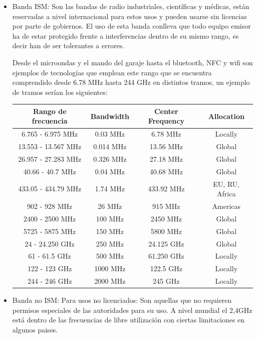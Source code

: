 \documentclass[a4paper ,12pt, onecolumn]{article}
\begin{document}
            \begin{itemize}
                \item Banda ISM: Son las bandas de radio industriales, científicas y médicas, están reservadas a 
                nivel internacional para estos usos y pueden usarse sin licencias por parte de gobiernos. El uso de esta
                banda conlleva que todo equipo emisor ha de estar protegido frente a interferencias dentro de su mismo 
                rango, es decir han de ser tolerantes a errores.
    
                Desde el microondas y el mando del garaje hasta el bluetooth, NFC y wifi son ejemplos de tecnologías
                que emplean este rango que se encuentra comprendido desde   6.78 MHz hasta 244 GHz en distintos tramos,
                un ejemplo de tramos serían los siguientes:
                \begin{center}
                    \begin{tabular}{||c | c | c| c ||} 
                    \hline
                    Rango de frecuencia & Bandwidth & Center Frequency & Allocation\\ [0.5ex] 
                    \hline
                    \hline
                        6.765 - 6.975 MHz &	0.03 MHz &	6.78 MHz	 & Locally \\ 
                        13.553 - 13.567 MHz &	0.014 MHz &	13.56 MHz	 & Global\\ 
                        26.957 - 27.283 MHz &	0.326 MHz &	27.18 MHz	 & Global\\ 
                        40.66 - 40.7 MHz &	0.04 MHz &	40.68 MHz	 & Global\\ 
                        433.05 - 434.79 MHz &	1.74 MHz &	433.92 MHz & EU, RU, Africa\\ 
                        902 - 928 MHz &	26 MHz&	915 MHz &	Americas\\   
                        2400 - 2500 MHz &	100 MHz &	2450 MHz & Global\\ 
                        5725 - 5875 MHz &	150 MHz &	5800 MHz & Global\\ 
                        24 - 24.250 GHz &	250 MHz &	24.125 GHz & 	Global\\ 
                        61 - 61.5 GHz &	500 MHz &	61.250 GHz & 	Locally \\ 
                        122 - 123 GHz &	1000 MHz &	122.5 GHz	 & Locally \\ 
                        244 - 246 GHz &	2000 MHz &	245 GHz & Locally \\ 
                    \hline
                    \end{tabular}
                \end{center}
                \item Banda no ISM: Para usos no licenciados: Son aquellas que no requieren permisos especiales de las 
                autoridades para su uso. A nivel mundial el 2,4GHz está dentro de las frecuencias de libre utilización 
                con ciertas limitaciones en algunos paises.


\end{itemize}
\end{document}
